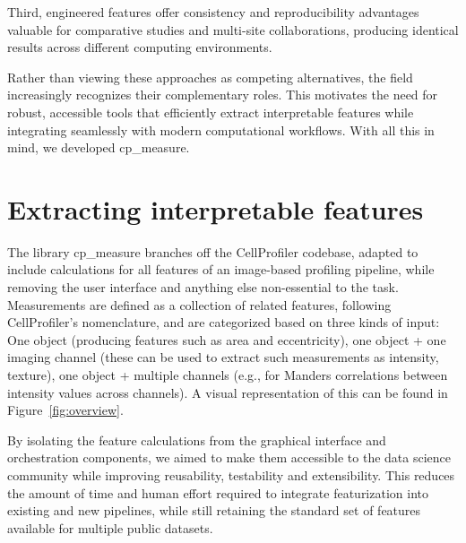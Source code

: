 \documentclass{article}
\begin{document}
Third, engineered features offer consistency and reproducibility advantages valuable for comparative studies and multi-site collaborations, producing identical results across different computing environments.

Rather than viewing these approaches as competing alternatives, the field increasingly recognizes their complementary roles. 
This motivates the need for robust, accessible tools that efficiently extract interpretable features while integrating seamlessly with modern computational workflows.
With all this in mind, we developed cp\_measure.

\section{Extracting interpretable features}
\label{sec:org61842b5}
The library cp\_measure branches off the CellProfiler codebase, adapted to include calculations for all features of an image-based profiling pipeline, while removing the user interface and anything else non-essential to the task. Measurements are defined as a collection of related features, following CellProfiler's nomenclature, and are categorized based on three kinds of input: One object (producing features such as area and eccentricity), one object + one imaging channel (these can be used to extract such measurements as intensity, texture), one object + multiple channels (e.g., for Manders correlations between intensity values across channels). A visual representation of this can be found in Figure~\ref{fig:overview}.

By isolating the feature calculations from the graphical interface and orchestration components, we aimed to make them accessible to the data science community while improving reusability, testability and extensibility. This reduces the amount of time and human effort required to integrate featurization into existing and new pipelines, while still retaining the standard set of features available for multiple public datasets.
\end{document}
